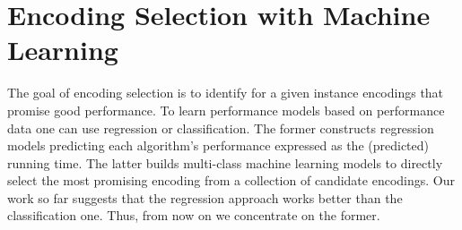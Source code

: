 \documentclass{new_tlp}
\begin{document}

\section{Encoding Selection with Machine Learning}

The goal of encoding selection is to identify for a given instance encodings
that promise good performance. To learn performance models based on performance 
data one can use regression or classification. The former constructs regression 
models predicting each algorithm's performance expressed as the (predicted) 
running time. The latter builds multi-class machine learning models to directly 
select the most promising encoding from a collection of candidate encodings. 
Our work so far suggests that the regression approach works better than the 
classification one. Thus, from now on we concentrate on the former.
\end{document}
